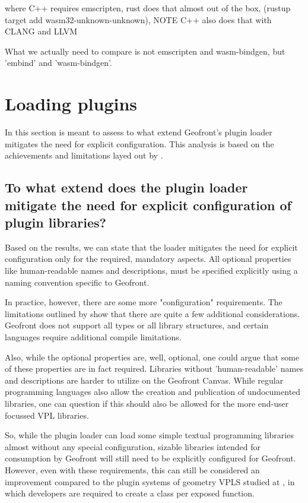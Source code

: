 \begin{note}
  where C++ requires emscripten, rust does that almost out of the box, (rustup target add wasm32-unknown-unknown), NOTE C++ also does that with CLANG and LLVM

  What we actually need to compare is not emscripten and wasm-bindgen, but 'embind' and 'wasm-bindgen'. 
\end{note}

\section{Loading plugins}
\label{sec:analyses:loading}

In this section is meant to assess to what extend Geofront's plugin loader mitigates the need for explicit configuration.
This analysis is based on the achievements and limitations layed out by .

\subsection*{To what extend does the plugin loader mitigate the need for explicit configuration of plugin libraries?}

Based on the results, we can state that the loader mitigates the need for explicit configuration only for the required, mandatory aspects. 
All optional properties like human-readable names and descriptions, must be specified explicitly using a naming convention specific to Geofront. 

In practice, however, there are some more "configuration" requirements. 
The limitations outlined by  show that there are quite a few additional considerations. 
Geofront does not support all types or all library structures, and certain languages require additional compile limitations.

Also, while the optional properties are, well, optional, one could argue that some of these properties are in fact required. 
Libraries without 'human-readable' names and descriptions are harder to utilize on the Geofront Canvas.
While regular programming languages also allow the creation and publication of undocumented libraries, one can question if this should also be allowed for the more end-user focussed VPL libraries.

So, while the plugin loader can load some simple textual programming libraries almost without any special configuration, sizable libraries intended for consumption by Geofront will still need to be explicitly configured for Geofront.
However, even with these requirements, this can still be considered an improvement compared to the plugin systems of geometry VPLS studied at , 
in which developers are required to create a class per exposed function.

